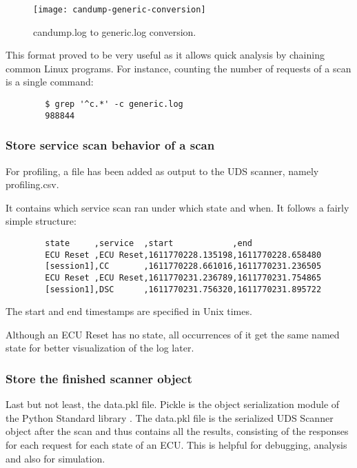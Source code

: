 \begin{figure}[h]
    \centering
    \texttt{[image: candump-generic-conversion]}
    \caption{candump.log to generic.log conversion.}
    \label{fig:candump-generic-conversion}
\end{figure}

This format proved to be very useful as it allows quick analysis by chaining common Linux programs.
For instance, counting the number of requests of a scan is a single command:
\begin{samepage}
\begin{verbatim}
        $ grep '^c.*' -c generic.log
        988844
\end{verbatim}
\end{samepage}

\subsubsection{Store service scan behavior of a scan}

For profiling, a file has been added as output to the UDS scanner, namely profiling.csv.

It contains which service scan ran under which state and when. It follows a fairly simple structure:

\begin{samepage}
    \begin{verbatim}
        state     ,service  ,start            ,end
        ECU Reset ,ECU Reset,1611770228.135198,1611770228.658480
        [session1],CC       ,1611770228.661016,1611770231.236505
        ECU Reset ,ECU Reset,1611770231.236789,1611770231.754865
        [session1],DSC      ,1611770231.756320,1611770231.895722
    \end{verbatim}
\end{samepage}

The start and end timestamps are specified in Unix times.

Although an ECU Reset has no state, all occurrences of it get the same named state for better visualization of the log later.

\subsubsection{Store the finished scanner object}

Last but not least, the data.pkl file. Pickle is the object serialization module of the Python Standard library \cite{pickle}. The data.pkl file is the serialized UDS Scanner object after the scan and thus contains all the results, consisting of the responses for each request for each state of an ECU. This is helpful for debugging, analysis and also for simulation.


